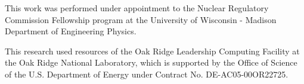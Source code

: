 This work was performed under appointment to the Nuclear Regulatory
Commission Fellowship program at the University of Wisconsin - Madison
Department of Engineering Physics. 

This research used resources of the Oak Ridge Leadership Computing
Facility at the Oak Ridge National Laboratory, which is supported by
the Office of Science of the U.S. Department of Energy under Contract
No. DE-AC05-00OR22725.
